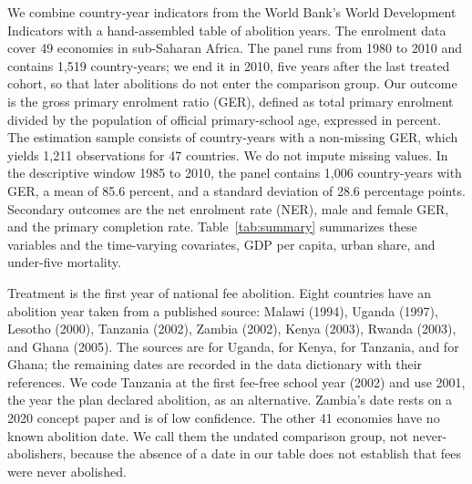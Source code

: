 \documentclass[12pt]{article}
\begin{document}
We combine country-year indicators from the World Bank's World Development Indicators \citep{WorldBank_OpenData} with a hand-assembled table of abolition years. The enrolment data cover 49 economies in sub-Saharan Africa. The panel runs from 1980 to 2010 and contains 1,519 country-years; we end it in 2010, five years after the last treated cohort, so that later abolitions do not enter the comparison group.
Our outcome is the gross primary enrolment ratio (GER), defined as total primary enrolment divided by the population of official primary-school age, expressed in percent. The estimation sample consists of country-years with a non-missing GER, which yields 1,211 observations for 47 countries.
We do not impute missing values. In the descriptive window 1985 to 2010, the panel contains 1,006 country-years with GER, a mean of 85.6 percent, and a standard deviation of 28.6 percentage points.
Secondary outcomes are the net enrolment rate (NER), male and female GER, and the primary completion rate. Table~\ref{tab:summary} summarizes these variables and the time-varying covariates, GDP per capita, urban share, and under-five mortality.



Treatment is the first year of national fee abolition. Eight countries have an abolition year taken from a published source: Malawi (1994), Uganda (1997), Lesotho (2000), Tanzania (2002), Zambia (2002), Kenya (2003), Rwanda (2003), and Ghana (2005). The sources are \citet{kan2020evaluating} for Uganda, \citet{oketch2010free} for Kenya, \citet{lindsjo2017everybody} for Tanzania, and \citet{pajibo2017influence} for Ghana; the remaining dates are recorded in the data dictionary with their references. We code Tanzania at the first fee-free school year (2002) and use 2001, the year the plan declared abolition, as an alternative. Zambia's date rests on a 2020 concept paper and is of low confidence. The other 41 economies have no known abolition date. We call them the undated comparison group, not never-abolishers, because the absence of a date in our table does not establish that fees were never abolished.
\end{document}

